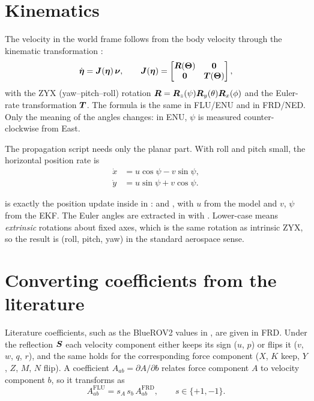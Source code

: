 \section{Kinematics}

The velocity in the world frame follows from the body velocity through the kinematic
transformation \cite[ch.~2]{fossen2011}:
\begin{equation}
  \dot{\boldsymbol{\eta}} = \boldsymbol{J}(\boldsymbol{\eta})\,\boldsymbol{\nu},
  \qquad
  \boldsymbol{J}(\boldsymbol{\eta}) = \begin{bmatrix} \boldsymbol{R}(\boldsymbol{\Theta}) & \boldsymbol{0} \\ \boldsymbol{0} & \boldsymbol{T}(\boldsymbol{\Theta}) \end{bmatrix},
  \label{eq:kinematics}
\end{equation}
with the ZYX (yaw--pitch--roll) rotation $\boldsymbol{R} = \boldsymbol{R}_z(\psi)\boldsymbol{R}_y(\theta)\boldsymbol{R}_x(\phi)$
and the Euler-rate transformation $\boldsymbol{T}$. The formula is the same in FLU/ENU and in
FRD/NED. Only the meaning of the angles changes: in ENU, $\psi$ is measured
counter-clockwise from East.

The propagation script needs only the planar part. With roll and pitch small, the
horizontal position rate is
\begin{equation}
\begin{aligned}
  \dot x &= u\cos\psi - v\sin\psi, \\
  \dot y &= u\sin\psi + v\cos\psi.
\end{aligned}
\label{eq:planar-kin}
\end{equation}

\begin{incode}
 is exactly the position update inside  in
:  and
, with $u$ from the model and $v$, $\psi$ from the EKF.
The Euler angles are extracted in  with
. Lower-case  means
\emph{extrinsic} rotations about fixed axes, which is the same rotation as intrinsic ZYX, so
the result is (roll, pitch, yaw) in the standard aerospace sense.
\end{incode}

\section{Converting coefficients from the literature}

Literature coefficients, such as the BlueROV2 values in 
\cite{vonbenzon2022}, are given in FRD. Under the reflection $\boldsymbol{S}$ each velocity component
either keeps its sign ($u$, $p$) or flips it ($v$, $w$, $q$, $r$), and the same holds for the
corresponding force component ($X$, $K$ keep, $Y$, $Z$, $M$, $N$ flip). A coefficient
$A_{ab} = \partial A/\partial b$ relates force component $A$ to velocity component $b$, so
it transforms as
\begin{equation}
  A_{ab}^\mathrm{FLU} = s_A\,s_b\,A_{ab}^\mathrm{FRD}, \qquad s \in \{+1, -1\}.
  \label{eq:coef-flip}
\end{equation}

